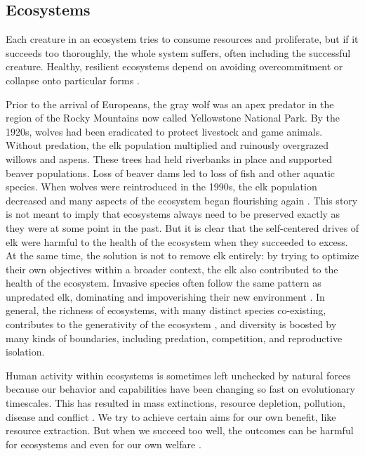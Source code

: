 \documentclass[11pt]{article}
\begin{document}
\subsection{Ecosystems}

Each creature in an ecosystem tries to consume resources and proliferate, but if it succeeds too thoroughly, the whole system suffers, often including the successful creature. Healthy, resilient ecosystems depend on avoiding overcommitment or collapse onto particular forms \citep{holling1973resilience, yachi1999biodiversity, tilman1996biodiversity}.

Prior to the arrival of Europeans, the gray wolf was an apex predator in the region of the Rocky Mountains now called Yellowstone National Park. By the 1920s, wolves had been eradicated to protect livestock and game animals. Without predation, the elk population multiplied and ruinously overgrazed willows and aspens. These trees had held riverbanks in place and supported beaver populations. Loss of beaver dams led to loss of fish and other aquatic species. When wolves were reintroduced in the 1990s, the elk population decreased and many aspects of the ecosystem began flourishing again \citep{ripple2012trophic}. This story is not meant to imply that ecosystems always need to be preserved exactly as they were at some point in the past. But it is clear that the self-centered drives of elk were harmful to the health of the ecosystem when they succeeded to excess. At the same time, the solution is not to remove elk entirely: by trying to optimize their own objectives within a broader context, the elk also contributed to the health of the ecosystem. Invasive species often follow the same pattern as unpredated elk, dominating and impoverishing their new environment \citep{pimentel2005update}. In general, the richness of ecosystems, with many distinct species co-existing, contributes to the generativity of the ecosystem \citep{hutchinson1959homage, tilman1982resource, schluter2000ecology, seehausen2014genomics}, and diversity is boosted by many kinds of boundaries, including predation, competition, and reproductive isolation. 




Human activity within ecosystems is sometimes left unchecked by natural forces because our behavior and capabilities have been changing so fast on evolutionary timescales. This has resulted in mass extinctions, resource depletion, pollution, disease and conflict \citep{ceballos2015accelerated, kolbert2014sixth, rockstrom2009safe}. We try to achieve certain aims for our own benefit, like resource extraction. But when we succeed too well, the outcomes can be harmful for ecosystems and even for our own welfare \citep{shiva1993monocultures, bateson1972steps}.
\end{document}
